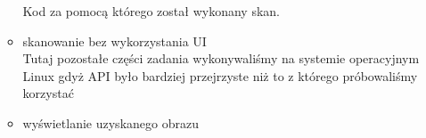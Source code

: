 \documentclass[a4paper,12pt]{extarticle}  %
\begin{document}
\begin{enumerate}
\begin{itemize}
\begin{figure}[H]
{			            }
		            \end{figure}
		            Kod za pomocą którego został wykonany skan.
		            
		      \item skanowanie bez wykorzystania  UI\\
		            Tutaj pozostałe części zadania wykonywaliśmy na systemie operacyjnym Linux gdyż API było bardziej przejrzyste niż to z którego próbowaliśmy korzystać
		      \item wyświetlanie uzyskanego obrazu
		            \begin{figure}[H]
			            \centering
		            \end{figure}

\end{itemize}
\end{enumerate}
\end{document}
